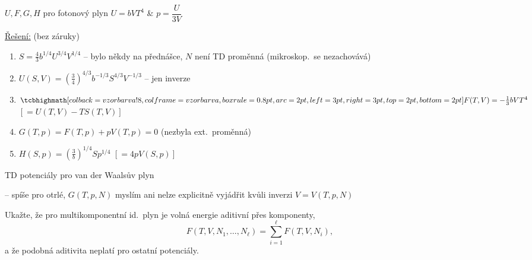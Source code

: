 \begin{priklad}[Příklad 3]
$U, F, G, H$ pro fotonový plyn \qquad $U = bVT^4$ \quad \& \quad $p = \dfrac{U}{3V}$
\end{priklad}

\color{NavyBlue}
\underline{Řešení:} (bez záruky)
\begin{enumerate}[label=\arabic*)]
  \item $S = \frac43 b^{1/4}U^{3/4}V^{1/4}$ \quad -- bylo někdy na přednášce, $N$ není TD proměnná (mikroskop.\ se nezachovává)
  \item $U(S,V) = \left(\frac34\right)^{4/3}b^{-1/3}S^{4/3}V^{-1/3}$ \quad -- jen inverze
  \item $\vzorec{F(T,V) = -\frac13 bVT^4}$ \qquad $[= U(T,V) - TS(T,V)]$
  \item $G(T,p) = F(T,p) + pV(T,p) = 0$ \qquad (nezbyla ext.\ proměnná)
  \item $H(S,p) = \left(\frac3b\right)^{1/4}Sp^{1/4}$ \qquad $[= 4pV(S,p)]$
\end{enumerate}
\color{black}

\begin{priklad}[Příklad 4*]
TD potenciály pro van der Waalsův plyn
\end{priklad}
\textcolor{NavyBlue}{-- spíše pro otrlé, $G(T,p,N)$ myslím ani nelze explicitně vyjádřit kvůli inverzi $V = V(T,p,N)$}

\begin{priklad}[Příklad 5*]
Ukažte, že pro multikomponentní id.\ plyn je volná energie aditivní přes komponenty,
\[ F(T,V,N_1,\dots,N_\ell) = \sum_{i=1}^\ell F(T,V,N_i), \]
a že podobná aditivita neplatí pro ostatní potenciály.
\end{priklad}

